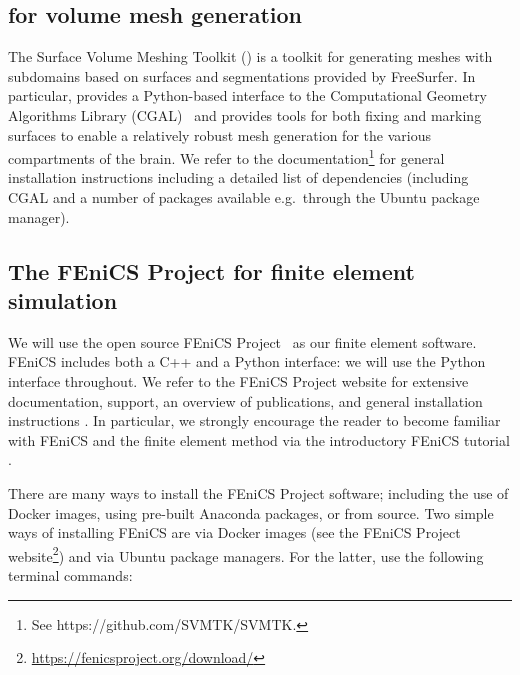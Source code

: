 \subsection{\svmtk{} for volume mesh generation}
\label{sec:chp2:tools:meshing:svmtk}

The Surface Volume Meshing Toolkit (\svmtk{}) is a toolkit for
generating meshes with subdomains based on surfaces and segmentations
provided by FreeSurfer. In particular, \svmtk{} provides a
Python-based interface to the Computational Geometry Algorithms
Library (CGAL)~\cite{fabri2000design} and provides tools for both
fixing and marking surfaces to enable a relatively robust mesh
generation for the various compartments of the brain.  We refer to the
\svmtk{} documentation\footnote{See https://github.com/SVMTK/SVMTK.} for
general installation instructions including a detailed list of
dependencies (including CGAL and a number of packages available
e.g.~through the Ubuntu package manager).

\subsection{The FEniCS Project for finite element simulation}
\label{sec:chp2:tools:fenics}

We will use the open source FEniCS Project~\cite{alnaes2015fenics,
  logg2012automated} as our finite element software. FEniCS
includes both a C++ and a Python interface: we will use the Python
interface throughout. We refer to the FEniCS Project website for
extensive documentation, support, an overview of publications, and general
installation instructions \cite{fenicsproject}. In particular, we
strongly encourage the reader to become familiar with FEniCS and the finite
element method via the introductory FEniCS tutorial
\cite{langtangen2016solving}.

There are many ways to install the FEniCS Project software; including
the use of Docker images, using pre-built Anaconda packages, or from
source. Two simple ways of installing FEniCS are via Docker
images (see the FEniCS Project
website\footnote{\url{https://fenicsproject.org/download/}}) and via Ubuntu
package managers. For the latter, use the following terminal commands:


